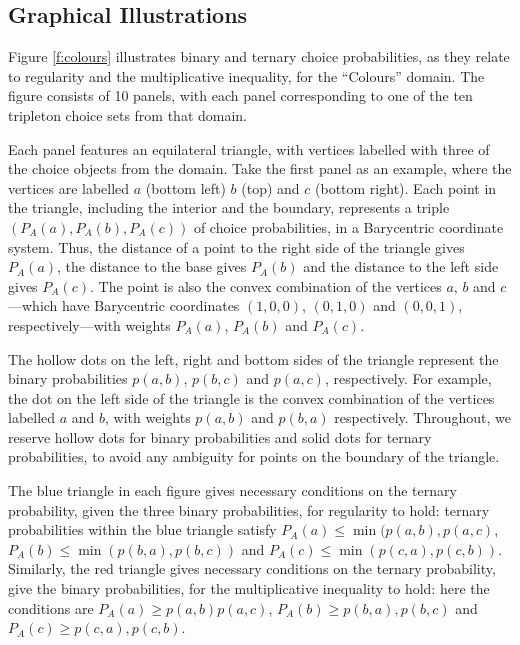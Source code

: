 \documentclass[11pt,letter]{article}
\begin{document}
\subsection{Graphical Illustrations}

Figure \ref{f:colours} illustrates binary and ternary choice probabilities, as they relate to regularity and the multiplicative inequality, for the ``Colours'' domain.
The figure consists of 10 panels, with each panel corresponding to one of the ten tripleton choice sets from that domain.

Each panel features an equilateral triangle, with vertices labelled with three of the choice objects from the domain.
Take the first panel as an example, where the vertices are labelled $a$ (bottom left) $b$ (top) and $c$ (bottom right).
Each point in the triangle, including the interior and the boundary, represents a triple $(P_A(a),P_A(b),P_A(c))$ of choice probabilities, in a Barycentric coordinate system.
Thus, the distance of a point to the right side of the triangle gives $P_A(a)$, the distance to the base gives $P_A(b)$ and the distance to the left side gives $P_A(c)$.
The point is also the convex combination of the vertices $a$, $b$ and $c$---which have Barycentric coordinates $(1,0,0)$, $(0,1,0)$ and $(0,0,1)$, respectively---with weights $P_A(a)$, $P_A(b)$ and $P_A(c)$.

The hollow dots on the left, right and bottom sides of the triangle represent the binary probabilities $p(a,b)$, $p(b,c)$ and $p(a,c)$, respectively.
For example, the dot on the left side of the triangle is the convex combination of the vertices labelled $a$ and $b$, with weights $p(a,b)$ and $p(b,a)$ respectively.
Throughout, we reserve hollow dots for binary probabilities and solid dots for ternary probabilities, to avoid any ambiguity for points on the boundary of the triangle.

The blue triangle in each figure gives necessary conditions on the ternary probability, given the three binary probabilities, for regularity to hold: ternary probabilities within the blue triangle satisfy $P_A(a) \leq \min(p(a,b), p(a,c)$, $P_A(b) \leq \min(p(b,a), p(b,c))$ and $P_A(c) \leq \min(p(c,a), p(c,b))$.
Similarly, the red triangle gives necessary conditions on the ternary probability, give the binary probabilities, for the multiplicative inequality to hold: here the conditions are $P_A(a) \geq p(a,b) p(a,c)$, $P_A(b) \geq p(b,a), p(b,c)$ and $P_A(c) \geq p(c,a), p(c,b)$.
\end{document}
